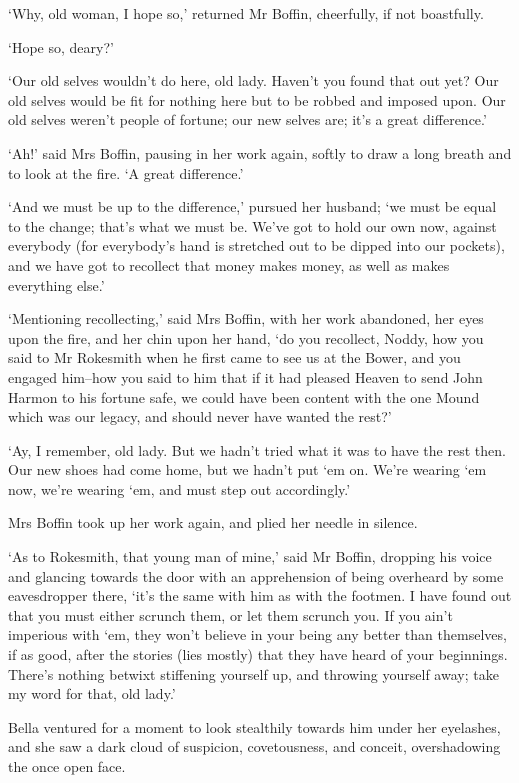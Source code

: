 ‘Why, old woman, I hope so,’ returned Mr Boffin, cheerfully, if not
boastfully.

‘Hope so, deary?’

‘Our old selves wouldn’t do here, old lady. Haven’t you found that out
yet? Our old selves would be fit for nothing here but to be robbed and
imposed upon. Our old selves weren’t people of fortune; our new selves
are; it’s a great difference.’

‘Ah!’ said Mrs Boffin, pausing in her work again, softly to draw a long
breath and to look at the fire. ‘A great difference.’

‘And we must be up to the difference,’ pursued her husband; ‘we must be
equal to the change; that’s what we must be. We’ve got to hold our own
now, against everybody (for everybody’s hand is stretched out to be
dipped into our pockets), and we have got to recollect that money makes
money, as well as makes everything else.’

‘Mentioning recollecting,’ said Mrs Boffin, with her work abandoned,
her eyes upon the fire, and her chin upon her hand, ‘do you recollect,
Noddy, how you said to Mr Rokesmith when he first came to see us at the
Bower, and you engaged him--how you said to him that if it had pleased
Heaven to send John Harmon to his fortune safe, we could have been
content with the one Mound which was our legacy, and should never have
wanted the rest?’

‘Ay, I remember, old lady. But we hadn’t tried what it was to have the
rest then. Our new shoes had come home, but we hadn’t put ‘em on. We’re
wearing ‘em now, we’re wearing ‘em, and must step out accordingly.’

Mrs Boffin took up her work again, and plied her needle in silence.

‘As to Rokesmith, that young man of mine,’ said Mr Boffin, dropping
his voice and glancing towards the door with an apprehension of being
overheard by some eavesdropper there, ‘it’s the same with him as with
the footmen. I have found out that you must either scrunch them, or let
them scrunch you. If you ain’t imperious with ‘em, they won’t believe
in your being any better than themselves, if as good, after the stories
(lies mostly) that they have heard of your beginnings. There’s nothing
betwixt stiffening yourself up, and throwing yourself away; take my word
for that, old lady.’

Bella ventured for a moment to look stealthily towards him under her
eyelashes, and she saw a dark cloud of suspicion, covetousness, and
conceit, overshadowing the once open face.


